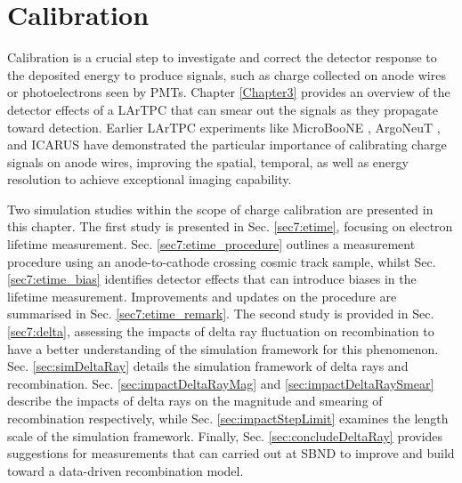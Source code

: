 
\chapter{Calibration}

\ifpdf
    \graphicspath{{Chapter7/Figs/Raster/}{Chapter7/Figs/PDF/}{Chapter7/Figs/}}
\else
    \graphicspath{{Chapter7/Figs/Vector/}{Chapter7/Figs/}}
\fi

Calibration is a crucial step to investigate and correct the detector response to the deposited energy to produce signals, such as charge collected on anode wires or photoelectrons seen by PMTs.
Chapter \ref{Chapter3} provides an overview of the detector effects of a LArTPC that can smear out the signals as they propagate toward detection.
Earlier LArTPC experiments like MicroBooNE \cite{uboone_calib, ubooneEtime}, ArgoNeuT \cite{argoneut_recomb}, and ICARUS \cite{icarus_recomb, GrayDiffusion} have demonstrated the particular importance of calibrating charge signals on anode wires, improving the spatial, temporal, as well as energy resolution to achieve exceptional imaging capability.

Two simulation studies within the scope of charge calibration are presented in this chapter.
The first study is presented in Sec. \ref{sec7:etime}, focusing on electron lifetime measurement.
Sec. \ref{sec7:etime_procedure} outlines a measurement procedure using an anode-to-cathode crossing cosmic track sample, whilst Sec. \ref{sec7:etime_bias} identifies detector effects that can introduce biases in the lifetime measurement.
Improvements and updates on the procedure are summarised in Sec. \ref{sec7:etime_remark}.
The second study is provided in Sec. \ref{sec7:delta}, assessing the impacts of delta ray fluctuation on recombination to have a better understanding of the simulation framework for this phenomenon.
Sec. \ref{sec:simDeltaRay} details the simulation framework of delta rays and recombination.
Sec. \ref{sec:impactDeltaRayMag} and \ref{sec:impactDeltaRaySmear} describe the impacts of delta rays on the magnitude and smearing of recombination respectively, while Sec. \ref{sec:impactStepLimit} examines the length scale of the simulation framework.
Finally, Sec. \ref{sec:concludeDeltaRay} provides suggestions for measurements that can carried out at SBND to improve and build toward a data-driven recombination model.


